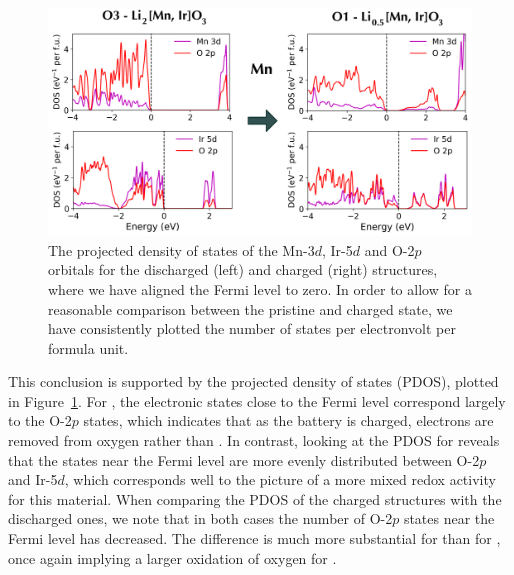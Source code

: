 \begin{refsection}
\begin{figure}[ht] 
\centering 
\captionsetup{width=0.9\linewidth}
\includegraphics[width=\textwidth]{Figures/batteries/charge_pdos_Mn_Ir.png} 
\caption{The projected density of states of the Mn-3$d$, Ir-5$d$ and O-2$p$ 
orbitals for the discharged (left) and charged (right) structures, where we 
have aligned the Fermi level to zero. In order to allow for a reasonable 
comparison between the pristine and charged state, we have consistently 
plotted the number of states per electronvolt per formula unit.} 
\label{batteries:fig-charge_pdos_Mn_Ir} 
\end{figure} 
 
This conclusion is supported by the projected density of states (PDOS), 
plotted in Figure~\ref{batteries:fig-charge_pdos_Mn_Ir}. For , the 
electronic states close to the Fermi level correspond largely to the O-2$p$ 
states, which indicates that as the battery is charged, electrons are removed 
from oxygen rather than . In contrast, looking at the \gls{PDOS} for 
 reveals that the states near the Fermi level are more evenly 
distributed between O-2$p$ and Ir-5$d$, which corresponds well to the picture 
of a more mixed redox activity for this material. When comparing the \gls{PDOS} of 
the charged structures with the discharged ones, we note that in both cases 
the number of O-2$p$ states near the Fermi level has decreased. The difference 
is much more substantial for  than for , once again 
implying a larger oxidation of oxygen for . 
 
 

\end{refsection}
